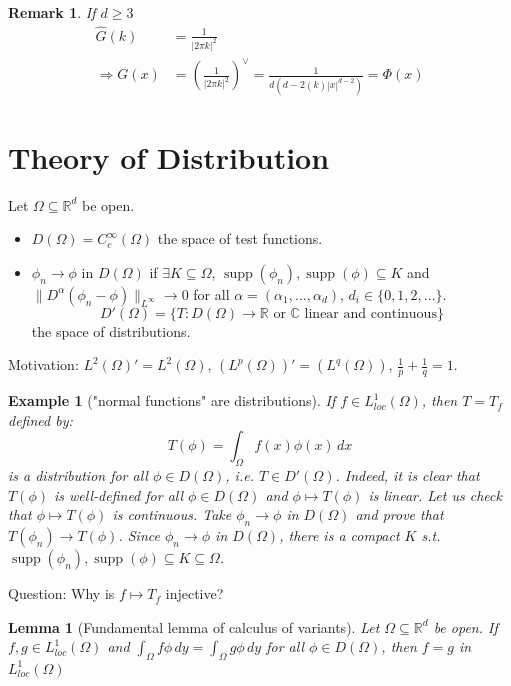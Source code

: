 \documentclass{report}
\theoremstyle{tommy}
\newtheorem{lem}[defn]{Lemma}
\newtheorem{eg}[defn]{Example}
\newtheorem{rem}[defn]{Remark}
\newcommand{\supp}{\operatorname{supp}}
\begin{document}
  \begin{rem}
    If \(d \ge 3\)
    \begin{align*}
      \hat G(k) 
      &= \frac{1}{|2 \pi k|^2}  \\
      \Rightarrow G(x) 
      &= \left(\frac{1}{|2 \pi k|^2}\right)^\lor
      = \frac{1}{d(d-2(k) |x|^{d-2})} 
      = \Phi(x)
    \end{align*}
  \end{rem}

  \section{Theory of Distribution}
  Let \(\Omega \subseteq \mathbb{R}^d\) be open.
  \begin{itemize}
    \item \(D(\Omega) = C_c^\infty(\Omega)\) the space of test functions.
    \item \(\phi_n \to \phi\) in \(D(\Omega)\) if \(\exists K \subseteq \Omega\), \(\supp(\phi_n), \supp(\phi) \subseteq K\) and \(\|D^\alpha(\phi_n - \phi)\|_{L^\infty} \to 0\) for all \(\alpha = (\alpha_1, \dots, \alpha_d)\), \(d_i \in \{0, 1, 2, \dots\}\).
    \[D'(\Omega) = \{T: D(\Omega) \to \mathbb{R} \text{ or } \mathbb{C} \text{ linear and continuous}\}\] the space of distributions.
  \end{itemize}

  Motivation: \(L^2(\Omega)' = L^2(\Omega)\), \((L^p(\Omega))' = (L^q(\Omega))\), \(\frac{1}{p} + \frac{1}{q} = 1\).


  \begin{eg}["normal functions" are distributions]
    If \(f \in L_{loc}^1(\Omega)\), then \(T = T_f\) defined by:
    \[T(\phi) = \int_{\Omega} f(x) \phi(x) \, dx\]
    is a distribution for all \(\phi \in D(\Omega)\), i.e. \(T \in D'(\Omega)\). Indeed, it is clear that \(T(\phi)\) is well-defined for all \(\phi \in D(\Omega)\) and \(\phi \mapsto T(\phi)\) is linear. Let us check that \(\phi \mapsto T(\phi)\) is continuous. Take \(\phi_n \to \phi\) in \(D(\Omega)\) and prove that \(T(\phi_n) \to T(\phi)\). Since \(\phi_n \to \phi\) in \(D(\Omega)\), there is a compact \(K\) s.t. \(\supp(\phi_n), \supp(\phi) \subseteq K \subseteq \Omega\).
  \end{eg}

  Question: Why is \(f \mapsto T_f\) injective?

  \begin{lem}[Fundamental lemma of calculus of variants]
    Let \(\Omega \subseteq \mathbb{R}^d\) be open. If \(f, g \in L_{loc}^1(\Omega)\) and 
    \(\int_\Omega f \phi \, dy = \int_{\Omega} g \phi \, dy\) for all \(\phi \in D(\Omega) \), then \(f = g\) in \(L_{loc}^1(\Omega)\)
  \end{lem}
\end{document}
